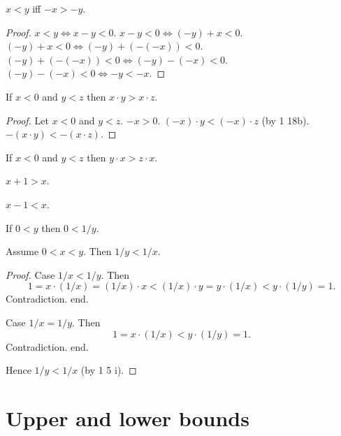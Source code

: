 \documentclass{article}
\begin{document}
\begin{forthel}
\begin{proposition}
$x < y$ iff $-x > -y$.
\end{proposition}
\begin{proof}
$x < y \iff x - y < 0$.
$x - y < 0 \iff (-y) + x < 0$.
$(-y) + x < 0 \iff (-y)+(-(-x)) < 0$.
$(-y)+(-(-x)) < 0 \iff (-y)-(-x) < 0$.
$(-y)-(-x) < 0 \iff -y < -x$.
\end{proof}

\begin{proposition}[title=1 18 c]
If $x < 0$ and $y < z$ then
$x \cdot y > x \cdot z$.
\end{proposition}
\begin{proof}
Let $x < 0$ and $y < z$.
$-x > 0$.
$(-x)\cdot y < (-x)\cdot z$ (by 1 18b).
$-(x\cdot y) < -(x\cdot z)$.
\end{proof}

\begin{proposition}[title=1 18 cc]
If $x < 0$ and $y < z$ then
$y \cdot x > z \cdot x$.
\end{proposition}

\begin{proposition}
$x + 1 > x$.
\end{proposition}

\begin{proposition}
$x - 1 < x$.
\end{proposition}

\begin{proposition}[title=1 18 e]
If $0 < y$ then $0 < 1/y$.
\end{proposition}

\begin{proposition}[title=1 18 ee]
Assume $0 < x < y$.
Then $1/y < 1/x$.
\end{proposition}
\begin{proof}
Case $1/x < 1/y$.
Then
\[ 1 = x \cdot (1/x) = (1/x) \cdot x < (1/x) \cdot y =
y \cdot (1/x) < y \cdot (1/y) = 1. \]
Contradiction. end.

Case $1/x = 1/y$. Then
\[ 1 = x \cdot (1/x) < y \cdot (1/y) = 1. \]
Contradiction. end.

Hence $1/y < 1/x$ (by 1 5 i).
\end{proof}

\end{forthel}


\section{Upper and lower bounds}
\end{document}
